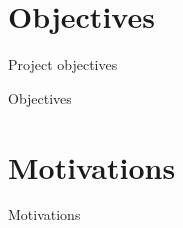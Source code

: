 \documentclass{beamer}
\begin{document}
\section{Objectives}
    \begin{frame}{}
        \centering
        \huge
        Project objectives
    \end{frame}

    \begin{frame}{Objectives}
        \centering
        \begin{minipage}{0.55\textwidth}
        \end{minipage}
    \end{frame}

\section{Motivations}
    \begin{frame}{}
        \centering
        \huge
        Motivations
    \end{frame}
\end{document}
